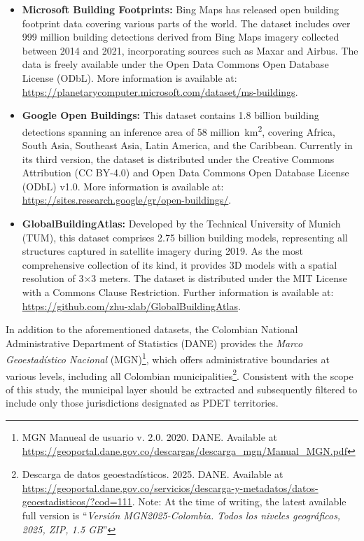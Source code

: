 \documentclass[12pt]{article}
\begin{document}
\begin{itemize}
  \item \textbf{Microsoft Building Footprints:} Bing Maps has released open building footprint data covering various parts of the world. The dataset includes over 999 million building detections derived from Bing Maps imagery collected between 2014 and 2021, incorporating sources such as Maxar and Airbus. The data is freely available under the Open Data Commons Open Database License (ODbL). More information is available at: \url{https://planetarycomputer.microsoft.com/dataset/ms-buildings}.

  \item \textbf{Google Open Buildings:} This dataset contains 1.8 billion building detections spanning an inference area of 58 million~km\textsuperscript{2}, covering Africa, South Asia, Southeast Asia, Latin America, and the Caribbean. Currently in its third version, the dataset is distributed under the Creative Commons Attribution (CC BY-4.0) and Open Data Commons Open Database License (ODbL) v1.0. More information is available at: \url{https://sites.research.google/gr/open-buildings/}.

  \item \textbf{GlobalBuildingAtlas:} Developed by the Technical University of Munich (TUM), this dataset comprises 2.75 billion building models, representing all structures captured in satellite imagery during 2019. As the most comprehensive collection of its kind, it provides 3D models with a spatial resolution of 3$\times$3 meters. The dataset is distributed under the MIT License with a Commons Clause Restriction. Further information is available at: \url{https://github.com/zhu-xlab/GlobalBuildingAtlas}.

\end{itemize}

In addition to the aforementioned datasets, the Colombian National Administrative Department of Statistics (DANE) provides the \textit{Marco Geoestadístico Nacional} (MGN)\footnote{MGN Manueal de usuario v. 2.0. 2020. DANE.  Available at \url{https://geoportal.dane.gov.co/descargas/descarga_mgn/Manual_MGN.pdf}}, which offers administrative boundaries at various levels, including all Colombian municipalities\footnote{Descarga de datos geoestadísticos. 2025. DANE. Available at \url{https://geoportal.dane.gov.co/servicios/descarga-y-metadatos/datos-geoestadisticos/?cod=111}. Note: At the time of writing, the latest available full version is ``\textit{Versión MGN2025-Colombia. Todos los niveles geográficos, 2025, ZIP, 1.5 GB}''}. Consistent with the scope of this study, the municipal layer should be extracted and subsequently filtered to include only those jurisdictions designated as PDET territories.
\end{document}
